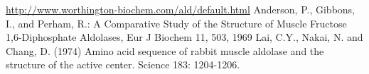 \begin{thebibliography}{WW}
 \url{http://www.worthington-biochem.com/ald/default.html}
 Anderson, P., Gibbons, I., and Perham, R.:
    A Comparative Study of the Structure of Muscle Fructose 1,6-Diphosphate Aldolases,
    Eur J Biochem 11, 503, 1969
  Lai, C.Y., Nakai, N. and Chang, D. (1974)
    Amino acid sequence of rabbit muscle aldolase and the structure of the active center.
    Science 183: 1204-1206.
\end{thebibliography}

